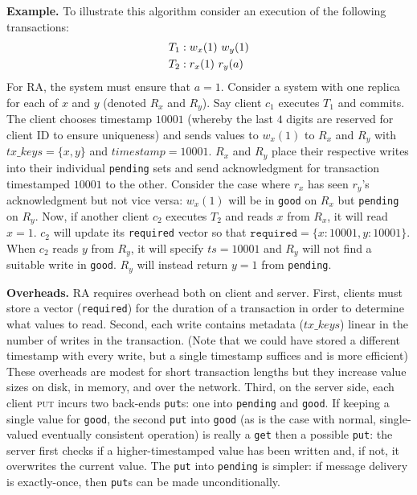 \vspace{1em}\noindent\textbf{Example.} To illustrate this algorithm consider an execution of the following transactions:
\begin{align*}
\small\vspace{-1em}
T_1 &: w_x(1)~w_y(1)
\\T_2 &: r_x(1)~r_y(a)
\end{align*}
For RA, the system must ensure that $a=1$. Consider a system with one
replica for each of $x$ and $y$ (denoted $R_x$ and $R_y$). Say client
$c_1$ executes $T_1$ and commits. The client chooses timestamp $10001$
(whereby the last $4$ digits are reserved for client ID to ensure
uniqueness) and sends values to $w_x(1)$ to $R_x$ and $R_y$ with
$tx\_keys = \{x,y\}$ and $timestamp=10001$. $R_x$ and $R_y$ place
their respective writes into their individual \texttt{pending} sets
and send acknowledgment for transaction timestamped $10001$ to the
other. Consider the case where $r_x$ has seen $r_y$'s acknowledgment
but not vice versa: $w_x(1)$ will be in \texttt{good} on $R_x$
but \texttt{pending} on $R_y$. Now, if another client $c_2$ executes
$T_2$ and reads $x$ from $R_x$, it will read $x=1$. $c_2$ will update
its \texttt{required} vector so that $\texttt{required}=\{x:10001,
y:10001\}$. When $c_2$ reads $y$ from $R_y$, it will specify
$ts=10001$ and $R_y$ will not find a suitable write
in \texttt{good}. $R_y$ will instead return $y=1$
from \texttt{pending}.

\vspace{1em}\noindent\textbf{Overheads.} RA requires overhead both on client and server. First, clients must store a vector (\texttt{required}) for the duration of a transaction in order to determine what values to read. Second, each write contains metadata ($tx\_keys$) linear in the number of writes in the transaction. (Note that we could have stored a different timestamp with every write, but a single timestamp suffices and is more efficient) These overheads are modest for short transaction lengths but they increase value sizes on disk, in memory, and over the network. Third, on the server side, each client \textsc{put} incurs two back-ends \texttt{put}s: one into \texttt{pending} and \texttt{good}. If keeping a single value for \texttt{good}, the second \texttt{put} into \texttt{good} (as is the case with normal, single-valued eventually consistent operation) is really a \texttt{get} then a possible \texttt{put}: the server first checks if a higher-timestamped value has been written and, if not, it overwrites the current value. The \texttt{put} into \texttt{pending} is simpler: if message delivery is exactly-once, then \texttt{put}s can be made unconditionally.

